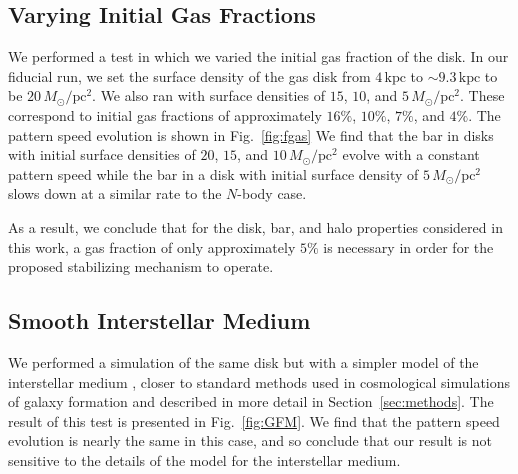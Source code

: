 \documentclass[twocolumn,linenumbers]{aastex631}
\newcommand{\Nbody}{$N$-body}
\newcommand{\Msun}{\ensuremath{M_{\odot}}}
\begin{document}
\subsection{Varying Initial Gas Fractions}
We performed a test in which we varied the initial gas fraction of the
disk. In our fiducial run, we set the surface density of the gas disk from
$4\,\textrm{kpc}$ to $\sim9.3\,\textrm{kpc}$ to be $20\,\Msun/\textrm{pc}^2$.
We also ran with surface densities of $15$, $10$, and
$5\,\Msun/\textrm{pc}^2$. These correspond to initial gas fractions of
approximately $16\%$, $10\%$, $7\%$, and $4\%$. The pattern speed evolution is
shown in Fig.~\ref{fig:fgas} We find that the bar in disks with
initial surface densities of $20$, $15$, and $10\,\Msun/\textrm{pc}^2$ evolve
with a constant pattern speed while the bar in a disk with initial surface
density of $5\,\Msun/\textrm{pc}^2$ slows down at a similar rate to the \Nbody{} case.

As a result, we conclude that for the disk, bar, and halo properties
considered in this work, a gas fraction of only approximately $5\%$ is
necessary in order for the proposed stabilizing mechanism to operate.



\subsection{Smooth Interstellar Medium}
We performed a simulation of the same disk but with a simpler model of the
interstellar medium \citep{2003MNRAS.339..289S}, closer to standard methods used
in cosmological simulations of galaxy formation and described in more detail in
Section~\ref{sec:methods}. The result of this test is presented in
Fig.~\ref{fig:GFM}. We find that the pattern speed evolution is nearly the same
in this case, and so conclude that our result is not sensitive to the details of
the model for the interstellar medium.
\end{document}
